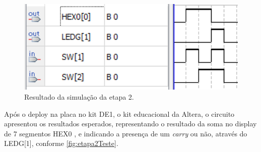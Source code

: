 		\begin{figure}[H]
		    \centering
			\caption{\label{fig:etapa2Simulacao}Resultado da simulação da etapa 2.}
			\includegraphics[width=1\textwidth]{img/etapa2/SimulacaoMeioSomador1Bit}
		\end{figure}

		Após o deploy na placa no kit DE1, o kit educacional da Altera, o circuito apresentou
		 os resultados esperados, representando o resultado da soma no display de 7 segmentos HEX0 ,
		e indicando a presença de um \textit{carry} ou não, através do LEDG[1],
		 conforme \autoref{fig:etapa2Teste}.

